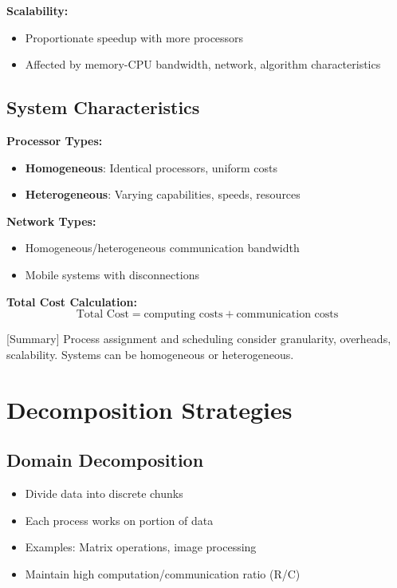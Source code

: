 \documentclass[12pt]{article}
\begin{document}
\textbf{Scalability:}
\begin{itemize}
    \item Proportionate speedup with more processors
    \item Affected by memory-CPU bandwidth, network, algorithm characteristics
\end{itemize}

\subsection{System Characteristics}

\textbf{Processor Types:}
\begin{itemize}
    \item \textbf{Homogeneous}: Identical processors, uniform costs
    \item \textbf{Heterogeneous}: Varying capabilities, speeds, resources
\end{itemize}

\textbf{Network Types:}
\begin{itemize}
    \item Homogeneous/heterogeneous communication bandwidth
    \item Mobile systems with disconnections
\end{itemize}

\textbf{Total Cost Calculation:}
\[
    \text{Total Cost} = \text{computing costs} + \text{communication costs}
\]

[Summary] Process assignment and scheduling consider granularity, overheads, scalability. Systems can be homogeneous or heterogeneous.

\section{Decomposition Strategies}

\subsection{Domain Decomposition}

\begin{itemize}
    \item Divide data into discrete chunks
    \item Each process works on portion of data
    \item Examples: Matrix operations, image processing
    \item Maintain high computation/communication ratio (R/C)
\end{itemize}
\end{document}
